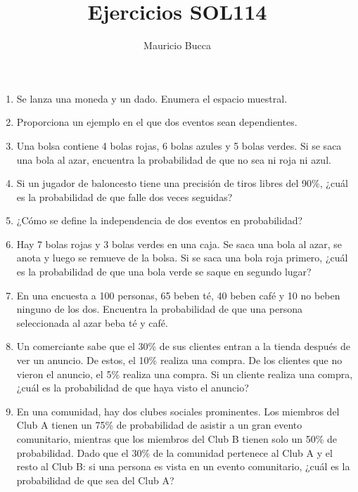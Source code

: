 \documentclass[
  letterpaper,
  DIV=11,
  numbers=noendperiod]{scrartcl}
\title{Ejercicios SOL114}
\author{Mauricio Bucca}
\date{}
\begin{document}
\maketitle
\ifdefined\Shaded\renewenvironment{Shaded}{\begin{tcolorbox}[breakable, interior hidden, enhanced, frame hidden, boxrule=0pt, borderline west={3pt}{0pt}{shadecolor}, sharp corners]}{\end{tcolorbox}}\fi

\begin{enumerate}
\def\labelenumi{\arabic{enumi}.}
\item
  Se lanza una moneda y un dado. Enumera el espacio muestral.
\item
  Proporciona un ejemplo en el que dos eventos sean dependientes.
\item
  Una bolsa contiene 4 bolas rojas, 6 bolas azules y 5 bolas verdes. Si
  se saca una bola al azar, encuentra la probabilidad de que no sea ni
  roja ni azul.
\item
  Si un jugador de baloncesto tiene una precisión de tiros libres del
  90\%, ¿cuál es la probabilidad de que falle dos veces seguidas?
\item
  ¿Cómo se define la independencia de dos eventos en probabilidad?
\item
  Hay 7 bolas rojas y 3 bolas verdes en una caja. Se saca una bola al
  azar, se anota y luego se remueve de la bolsa. Si se saca una bola
  roja primero, ¿cuál es la probabilidad de que una bola verde se saque
  en segundo lugar?
\item
  En una encuesta a 100 personas, 65 beben té, 40 beben café y 10 no
  beben ninguno de los dos. Encuentra la probabilidad de que una persona
  seleccionada al azar beba té y café.
\item
  Un comerciante sabe que el 30\% de sus clientes entran a la tienda
  después de ver un anuncio. De estos, el 10\% realiza una compra. De
  los clientes que no vieron el anuncio, el 5\% realiza una compra. Si
  un cliente realiza una compra, ¿cuál es la probabilidad de que haya
  visto el anuncio?
\item
  En una comunidad, hay dos clubes sociales prominentes. Los miembros
  del Club A tienen un 75\% de probabilidad de asistir a un gran evento
  comunitario, mientras que los miembros del Club B tienen solo un 50\%
  de probabilidad. Dado que el 30\% de la comunidad pertenece al Club A
  y el resto al Club B: si una persona es vista en un evento
  comunitario, ¿cuál es la probabilidad de que sea del Club A?

\end{enumerate}
\end{document}
